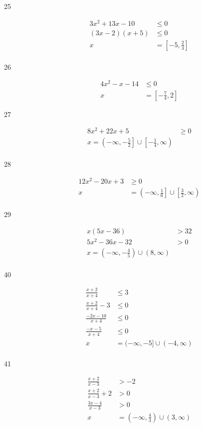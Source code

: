 \documentclass[fleqn,addpoints]{exam}
\begin{document}
\begin{description}
\item[25]
\begin{align*}
  3x^2+13x-10 & \leq 0 \\
  (3x-2)(x+5) & \leq 0 \\
  x &= \left[ -5, \frac{2}{3} \right] \\
\end{align*}

\item[26]
\begin{align*}
  4x^2-x-14 & \leq 0 \\
  x & = \left[- \frac{7}{4}, 2 \right]
\end{align*}

\item[27]
\begin{align*}
  8x^2+22x+5 & \geq 0 \\
  x = \left( -\infty, - \frac{5}{2} \right] \cup \left[-\frac{1}{4}, \infty \right) \\
\end{align*}

\item[28]
\begin{align*}
  12x^2-20x+3 & \geq 0 \\
  x &= \left( -\infty, \frac{1}{6} \right] \cup \left[ \frac{3}{2}, \infty \right) \\
\end{align*}

\item[29]
\begin{align*}
  x(5x-36) &> 32 \\
  5x^2-36x-32 &> 0 \\
  x = \left( -\infty, -\frac{4}{5} \right) \cup (8, \infty) \\
\end{align*}

\item[40]
\begin{align*}
  \frac{x+2}{x+4} & \leq 3 \\
  \frac{x+2}{x+4} - 3 & \leq 0 \\
  \frac{-2x-10}{x+4} & \leq 0 \\
  \frac{-x-5}{x+4} & \leq 0 \\
  x &= (-\infty, -5] \cup (-4, \infty) \\
\end{align*}

\item[41]
\begin{align*}
  \frac{x+2}{x-3} &> -2 \\
  \frac{x+2}{x-3} + 2 &> 0 \\
  \frac{3x-4}{x-3} &> 0 \\
  x &= \left( -\infty, \frac{4}{3} \right) \cup (3, \infty) \\
\end{align*}


\end{description}
\end{document}

